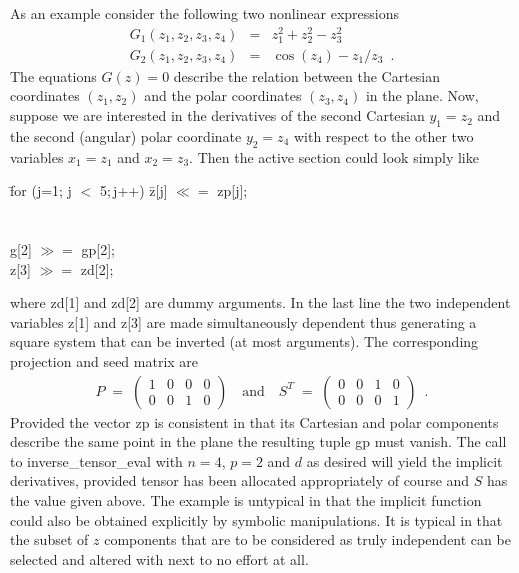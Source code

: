 \documentclass[11pt,twoside]{article}
\begin{document}
As an example consider the following two nonlinear expressions
\begin{eqnarray*}
      G_1(z_1,z_2,z_3,z_4) & = & z_1^2+z_2^2-z_3^2  \\
      G_2(z_1,z_2,z_3,z_4) & = & \cos(z_4) - z_1/z_3 \enspace   .
\end{eqnarray*}   
The equations $G(z)=0$ describe the relation between the Cartesian 
coordinates $(z_1,z_2)$ and the polar coordinates $(z_3,z_4)$ in the plane. 
Now, suppose we are interested in the derivatives of the second Cartesian 
$y_1=z_2$ and the second (angular) polar coordinate $y_2=z_4$ with respect 
to the other two variables $x_1=z_1$ and $x_2=z_3$. Then the active section 
could look simply like
%
\begin{tabbing}
\hspace{1.5in}\={\sf for (j=1; j $<$ 5;$\,$j++)}\hspace{0.15in} \= {\sf z[j] \boldmath $\ll=$ \unboldmath  zp[j];}\\
\\
\\
 \> {\sf g[2] \boldmath $\gg=$ \unboldmath gp[2];}\\
 \> {\sf z[3] \boldmath $\gg=$ \unboldmath zd[2];}
\end{tabbing}     
%
where {\sf zd[1]} and {\sf zd[2]} are dummy arguments.
In the last line the two independent variables {\sf z[1]} and 
{\sf z[3]} are made 
simultaneously dependent thus generating a square system that can be 
inverted (at most arguments). The corresponding projection and seed
matrix are
\begin{eqnarray*}
P \;=\; \left( \begin{array}{cccc}
               1 & 0 & 0 & 0 \\
               0 & 0 & 1 & 0 
            \end{array}\right) \quad \mbox{and} \quad
S^T \; = \; \left( \begin{array}{cccc}
               0 & 0 & 1 & 0 \\
               0 & 0 & 0 & 1
            \end{array}\right)  \enspace . 
\end{eqnarray*}
Provided the vector {\sf zp} is consistent in that its Cartesian and polar
components describe the same point in the plane the resulting tuple
{\sf gp} must vanish. The call to {\sf inverse\_tensor\_eval} with 
$n=4$, $p=2$ and $d$
as desired will yield the implicit derivatives, provided 
{\sf tensor} has been allocated appropriately of course and $S$ has the value
given above. 
%
The example is untypical in that the implicit function could also be 
obtained explicitly by symbolic mani\-pu\-lations. It is typical in that
the subset of $z$ components that are to be considered as truly 
independent can be selected and altered with next to no effort at all.
\end{document}
